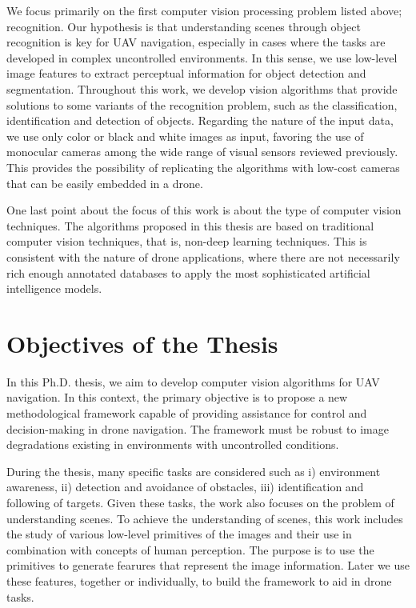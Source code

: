 We focus primarily on the first computer vision processing problem listed above; recognition. Our hypothesis is that understanding scenes through object recognition is key for UAV navigation, especially in cases where the tasks are developed in complex uncontrolled environments. In this sense, we use low-level image features to extract perceptual information for object detection and segmentation. Throughout this work, we develop vision algorithms that provide solutions to some variants of the recognition problem, such as the classification, identification and detection of objects. Regarding the nature of the input data, we use only color or black and white images as input, favoring the use of monocular cameras among the wide range of visual sensors reviewed previously. This provides the possibility of replicating the algorithms with low-cost cameras that can be easily embedded in a drone.

One last point about the focus of this work is about the type of computer vision techniques. The algorithms proposed in this thesis are based on traditional computer vision techniques, that is, non-deep learning techniques. This is consistent with the nature of drone applications, where there are not necessarily rich enough annotated databases to apply the most sophisticated artificial intelligence models.

\section*{Objectives of the Thesis}

In this Ph.D. thesis, we aim to develop computer vision algorithms for UAV navigation. In this context, the primary objective is to propose a new methodological framework capable of providing assistance for control and decision-making in drone navigation. The framework must be robust to image degradations existing in environments with uncontrolled conditions.

During the thesis, many specific tasks are considered such as i) environment awareness, ii) detection and avoidance of obstacles, iii) identification and following of targets. Given these tasks, the work also focuses on the problem of understanding scenes. To achieve the understanding of scenes, this work includes the study of various low-level primitives of the images and their use in combination with concepts of human perception. The purpose is to use the primitives to generate fearures that represent the image information. Later we use these features, together or individually, to build the framework to aid in drone tasks.

